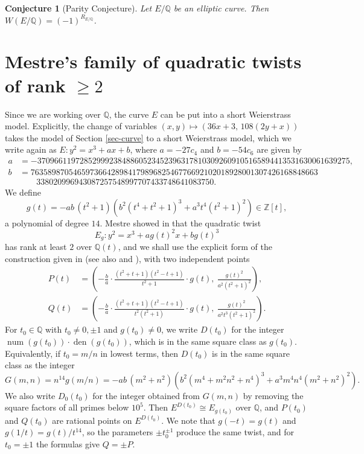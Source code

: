 \documentclass[11pt]{amsart}
\newtheorem{conj}[defn]{Conjecture}
\newcommand{\Q}{\mathbb Q}
\newcommand{\Z}{\mathbb Z}
\begin{document}
\begin{conj}[Parity Conjecture]\label{conj-parity}
Let $E/\Q$ be an elliptic curve. Then $W(E/\Q)=(-1)^{R_{E/\Q}}$.
\end{conj}

\section{Mestre's family of quadratic twists of rank $\geq 2$}\label{sec-mestre}

Since we are working over $\Q$, the curve $E$ can be put into a short Weierstrass model. Explicitly, the change of variables $(x,y)\mapsto(36x+3,\,108(2y+x))$ takes the model of Section \ref{sec-curve} to a short Weierstrass model, which we write again as $E: y^2 = x^3+ax+b$, where $a=-27c_4$ and $b=-54c_6$ are given by
\begin{align*}
a&=-37096611972852999238488605234523963178103092609105165894413531630061639275,\\
b&=76358987054659736642898417989682546776692102018928001307426168848663\\
&\qquad 338020996943087257548997707433748641083750.
\end{align*}
 We define
\begin{equation}\label{eq-g}
g(t)=-ab\,(t^2+1)\left(b^2(t^4+t^2+1)^3+a^3t^4(t^2+1)^2\right)\in\Z[t],
\end{equation}
a polynomial of degree $14$. Mestre showed in \cite{mestre} that the quadratic twist 
$$E_{g}\colon y^2=x^3+ag(t)^2x+bg(t)^3$$ has rank at least $2$ over $\Q(t)$, and we shall use the explicit form of the construction given in \cite[Example 4.1]{gusictadic} (see also \cite[Theorem 3.7]{rubinsilverberg} and \cite[Theorem 3]{stewarttop}), with two independent points
\begin{equation}\label{eq-PQ}
\begin{aligned}
P(t)&=\left(-\frac ba\cdot\frac{(t^2+t+1)(t^2-t+1)}{t^2+1}\cdot g(t),\ \frac{g(t)^2}{a^2(t^2+1)^2}\right),\\
Q(t)&=\left(-\frac ba\cdot\frac{(t^2+t+1)(t^2-t+1)}{t^2(t^2+1)}\cdot g(t),\ \frac{g(t)^2}{a^2t^3(t^2+1)^2}\right).
\end{aligned}
\end{equation}
For $t_0\in\Q$ with $t_0\neq 0,\pm 1$ and $g(t_0)\neq 0$, we write $D(t_0)$ for the integer $\operatorname{num}(g(t_0))\cdot\operatorname{den}(g(t_0))$, which is in the same square class as $g(t_0)$. Equivalently, if $t_0=m/n$ in lowest terms, then $D(t_0)$ is in the same square class as the integer
$$G(m,n)=n^{14}g(m/n)=-ab\,(m^2+n^2)\left(b^2(m^4+m^2n^2+n^4)^3+a^3m^4n^4(m^2+n^2)^2\right).$$
We also write $D_0(t_0)$ for the integer obtained from $G(m,n)$ by removing the square factors of all primes below $10^5$. Then $E^{D(t_0)}\cong E_{g(t_0)}$ over $\Q$, and $P(t_0)$ and $Q(t_0)$ are rational points on $E^{D(t_0)}$. We note that $g(-t)=g(t)$ and $g(1/t)=g(t)/t^{14}$, so the parameters $\pm t_0^{\pm 1}$ produce the same twist, and for $t_0=\pm 1$ the formulas give $Q=\pm P$.
\end{document}
